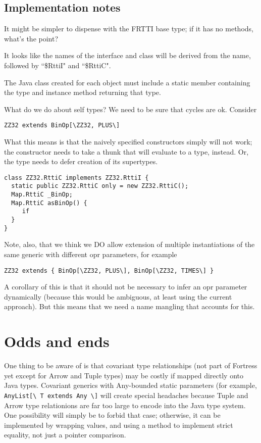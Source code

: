 \documentclass[11pt]{article}
\begin{document}
\subsection{Implementation notes}
It might be simpler to dispense with the FRTTI base type; if it has no methods, what's the point?

It looks like the names of the interface and class will be derived from the name, followed by ``\$RttiI" and ``\$RttiC".

The Java class created for each object must include a static member containing the type and instance method returning that type.

What do we do about self types?  We need to be sure that cycles are ok.  Consider
\begin{verbatim}
ZZ32 extends BinOp[\ZZ32, PLUS\]
\end{verbatim}
What this means is that the naively specified constructors simply will not work; the constructor needs to take a thunk that will evaluate to a type, instead.  Or, the type needs to defer creation of its supertypes.
\begin{verbatim}
class ZZ32.RttiC implements ZZ32.RttiI {
  static public ZZ32.RttiC only = new ZZ32.RttiC();
  Map.RttiC _BinOp;
  Map.RttiC asBinOp() {
     if 
  }
}
\end{verbatim}

Note, also, that we think we DO allow extension of multiple instantiations of the same generic with different opr parameters, for example
\begin{verbatim}
ZZ32 extends { BinOp[\ZZ32, PLUS\], BinOp[\ZZ32, TIMES\] }
\end{verbatim}
A corollary of this is that it should not be necessary to infer an opr parameter dynamically (because this would be ambiguous, at least using the current approach).  But this means that we need a name mangling that accounts for this.




\section{Odds and ends}

One thing to be aware of is that covariant type relationships (not part of Fortress yet except for Arrow and Tuple types) may be costly if mapped directly onto Java types.  Covariant generics with Any-bounded static parameters (for example,  \verb+AnyList[\ T extends Any \]+ will create special headaches because Tuple and Arrow type relationions are far too large to encode into the Java type system.  One possibility will simply be to forbid that case; otherwise, it can be implemented by wrapping values, and using a method to implement strict equality, not just a pointer comparison. 
\end{document}
